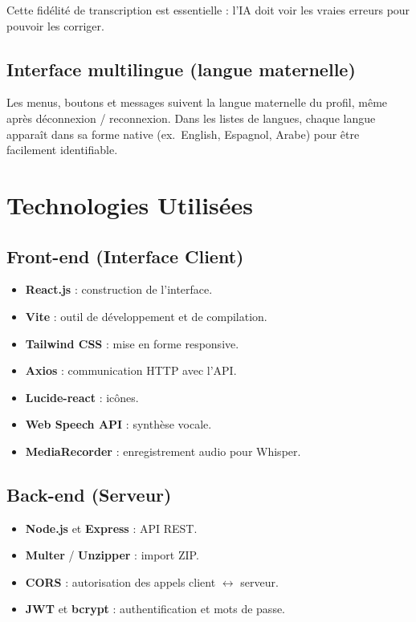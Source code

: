 \documentclass[12pt,twoside,letterpaper]{article}
\begin{document}
Cette fid\'elit\'e de transcription est essentielle :
l'IA doit voir les vraies erreurs pour pouvoir les corriger.

\subsection{Interface multilingue (langue maternelle)}

Les menus, boutons et messages suivent la langue maternelle du profil,
m\^eme apr\`es d\'econnexion / reconnexion.
Dans les listes de langues, chaque langue appara\^it dans sa forme native
(ex.\ English, Espagnol, Arabe) pour \^etre facilement identifiable.

\newpage

\section{Technologies Utilis\'ees}

\subsection{Front-end (Interface Client)}
\begin{itemize}[leftmargin=*]
  \item \textbf{React.js} : construction de l'interface.
  \item \textbf{Vite} : outil de d\'eveloppement et de compilation.
  \item \textbf{Tailwind CSS} : mise en forme responsive.
  \item \textbf{Axios} : communication HTTP avec l'API.
  \item \textbf{Lucide-react} : ic\^ones.
  \item \textbf{Web Speech API} : synth\`ese vocale.
  \item \textbf{MediaRecorder} : enregistrement audio pour Whisper.
\end{itemize}

\subsection{Back-end (Serveur)}
\begin{itemize}[leftmargin=*]
  \item \textbf{Node.js} et \textbf{Express} : API REST.
  \item \textbf{Multer} / \textbf{Unzipper} : import ZIP.
  \item \textbf{CORS} : autorisation des appels client $\leftrightarrow$ serveur.
  \item \textbf{JWT} et \textbf{bcrypt} : authentification et mots de passe.
\end{itemize}
\end{document}
